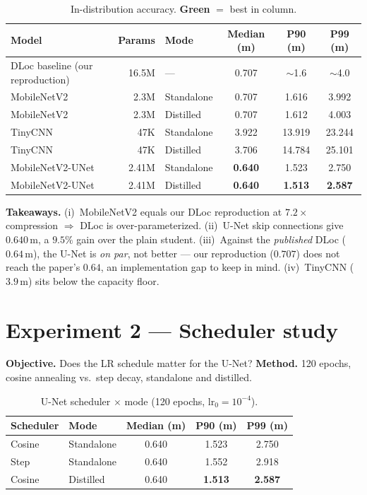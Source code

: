 \documentclass[11pt,a4paper]{article}
\newcommand{\best}[1]{\textcolor{ours}{\textbf{#1}}}
\begin{document}
\begin{table}[H]
\centering
\caption{In-distribution accuracy. \best{Green} $=$ best in column.}
\begin{tabular}{@{}lrlccc@{}}
\toprule
Model & Params & Mode & Median (m) & P90 (m) & P99 (m) \\
\midrule
DLoc baseline (our reproduction) & 16.5M & ---        & 0.707 & $\sim$1.6 & $\sim$4.0 \\
MobileNetV2   & 2.3M  & Standalone & 0.707 & 1.616 & 3.992 \\
MobileNetV2   & 2.3M  & Distilled  & 0.707 & 1.612 & 4.003 \\
TinyCNN       & 47K   & Standalone & 3.922 & 13.919 & 23.244 \\
TinyCNN       & 47K   & Distilled  & 3.706 & 14.784 & 25.101 \\
MobileNetV2-UNet & 2.41M & Standalone & \best{0.640} & 1.523 & 2.750 \\
MobileNetV2-UNet & 2.41M & Distilled  & \best{0.640} & \best{1.513} & \best{2.587} \\
\bottomrule
\end{tabular}
\end{table}

\textbf{Takeaways.} (i)~MobileNetV2 equals our DLoc reproduction at $7.2\times$ compression
$\Rightarrow$ DLoc is over-parameterized. (ii)~U-Net skip connections give $0.640$\,m, a $9.5\%$
gain over the plain student. (iii)~Against the \emph{published} DLoc ($0.64$\,m), the U-Net is
\emph{on par}, not better --- our reproduction ($0.707$) does not reach the paper's $0.64$, an
implementation gap to keep in mind. (iv)~TinyCNN ($3.9$\,m) sits below the capacity floor.

\section{Experiment 2 --- Scheduler study}

\textbf{Objective.} Does the LR schedule matter for the U-Net? \textbf{Method.} 120 epochs,
cosine annealing vs.\ step decay, standalone and distilled.

\begin{table}[H]
\centering
\caption{U-Net scheduler $\times$ mode (120 epochs, lr$_0=10^{-4}$).}
\begin{tabular}{@{}llccc@{}}
\toprule
Scheduler & Mode & Median (m) & P90 (m) & P99 (m) \\
\midrule
Cosine & Standalone & 0.640 & 1.523 & 2.750 \\
Step   & Standalone & 0.640 & 1.552 & 2.918 \\
Cosine & Distilled  & 0.640 & \best{1.513} & \best{2.587} \\
\bottomrule
\end{tabular}
\end{table}
\end{document}

